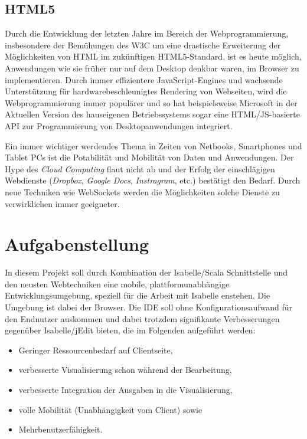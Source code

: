 \subsection{HTML5}

Durch die Entwicklung der letzten Jahre im Bereich der Webprogrammierung, insbesondere der
Bemühungen des W3C um eine drastische Erweiterung der Möglichkeiten von HTML im zukünftigen
HTML5-Standard, ist es heute möglich, Anwendungen wie sie früher nur auf dem Desktop denkbar waren,
im Browser zu implementieren. Durch immer effizientere JavaScript-Engines und wachsende
Unterstützung für hardwarebeschleunigtes Rendering von Webseiten, wird die Webprogrammierung immer
populärer und so hat beispielsweise Microsoft in der Aktuellen Version des hauseigenen
Betriebssystems sogar eine HTML/JS-basierte API zur Programmierung von Desktopanwendungen
integriert.

Ein immer wichtiger werdendes Thema in Zeiten von Netbooks, Smartphones und Tablet PCs ist die
Potabilität und Mobilität von Daten und Anwendungen. Der Hype des \textit{Cloud Computing} flaut
nicht ab und der Erfolg der einschlägigen Webdienste (\textit{Dropbox}, \textit{Google Docs},
\textit{Instragram}, etc.) bestätigt den Bedarf. Durch neue Techniken wie WebSockets werden die
Möglichkeiten solche Dienste zu verwirklichen immer geeigneter.

\section{Aufgabenstellung}

In diesem Projekt soll durch Kombination der Isabelle/Scala Schnittstelle und den neusten
Webtechniken eine mobile, plattformunabhängige Entwicklungsumgebung, speziell für die Arbeit mit
Isabelle enstehen. Die Umgebung ist dabei der Browser. Die IDE soll ohne Konfigurationsaufwand für
den Endnutzer auskommen und dabei trotzdem signifikante Verbesserungen gegenüber Isabelle/jEdit
bieten, die im Folgenden aufgeführt werden:

\begin{itemize}
  \item Geringer Ressourcenbedarf auf Clientseite,
  \item verbesserte Visualisierung schon während der Bearbeitung,
  \item verbesserte Integration der Ausgaben in die Visualisierung,
  \item volle Mobilität (Unabhängigkeit vom Client) sowie
  \item Mehrbenutzerfähigkeit.
\end{itemize}

